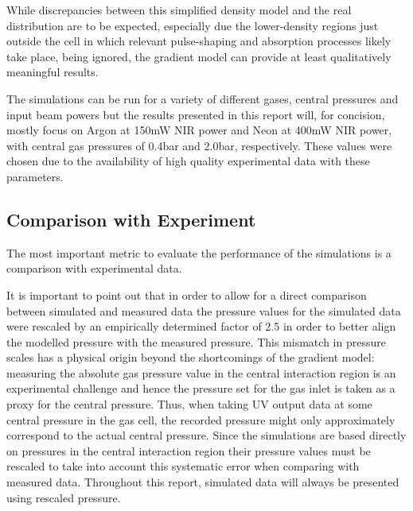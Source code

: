 \documentclass[a4paper]{jpconf}
\begin{document}
While discrepancies between this simplified density model and the real distribution are to be expected, especially due the lower-density regions just outside the cell in which relevant pulse-shaping and absorption processes likely take place, being ignored, the gradient model can provide at least qualitatively meaningful results. \par 
The simulations can be run for a variety of different gases, central pressures and input beam powers but the results presented in this report will, for concision, mostly focus on Argon at 150mW NIR power and Neon at 400mW NIR power, with central gas pressures of 0.4bar and 2.0bar, respectively. These values were chosen due to the availability of high quality experimental data with these parameters. 

\subsection{Comparison with Experiment}
The most important metric to evaluate the performance of the simulations is a comparison with experimental data. \par 
It is important to point out that in order to allow for a direct comparison between simulated and measured data the pressure values for the simulated data were rescaled by an empirically determined factor of 2.5 in order to better align the modelled pressure with the measured pressure. This mismatch in pressure scales has a physical origin beyond the shortcomings of the gradient model: measuring the absolute gas pressure value in the central interaction region is an experimental challenge and hence the pressure set for the gas inlet is taken as a proxy for the central pressure. Thus, when taking UV output data at some central pressure in the gas cell, the recorded pressure  might only approximately correspond to the actual central pressure. Since the simulations are based directly on pressures in the central interaction region their pressure values must be rescaled to take into account this systematic error when comparing with measured data. Throughout this report, simulated data will always be presented using rescaled pressure. \par 
\end{document}
